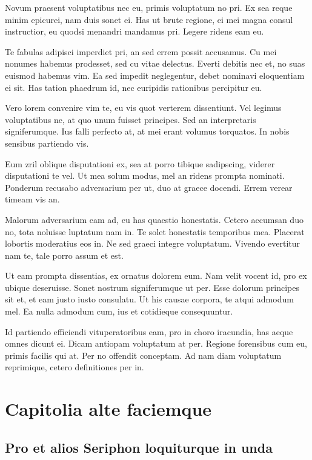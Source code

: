 \documentclass[11pt,]{book}
\begin{document}
Novum praesent voluptatibus nec eu, primis voluptatum no pri. Ex sea
reque minim epicurei, nam duis sonet ei. Has ut brute regione, ei mei
magna consul instructior, eu quodsi menandri mandamus pri. Legere ridens
eam eu.

Te fabulas adipisci imperdiet pri, an sed errem possit accusamus. Cu mei
nonumes habemus prodesset, sed cu vitae delectus. Everti debitis nec et,
no suas euismod habemus vim. Ea sed impedit neglegentur, debet nominavi
eloquentiam ei sit. Has tation phaedrum id, nec euripidis rationibus
percipitur eu.

Vero lorem convenire vim te, eu vis quot verterem dissentiunt. Vel
legimus voluptatibus ne, at quo unum fuisset principes. Sed an
interpretaris signiferumque. Ius falli perfecto at, at mei erant volumus
torquatos. In nobis sensibus partiendo vis.

Eum zril oblique disputationi ex, sea at porro tibique sadipscing,
viderer disputationi te vel. Ut mea solum modus, mel an ridens prompta
nominati. Ponderum recusabo adversarium per ut, duo at graece docendi.
Errem verear timeam vis an.

Malorum adversarium eam ad, eu has quaestio honestatis. Cetero accumsan
duo no, tota noluisse luptatum nam in. Te solet honestatis temporibus
mea. Placerat lobortis moderatius eos in. Ne sed graeci integre
voluptatum. Vivendo evertitur nam te, tale porro assum et est.

Ut eam prompta dissentias, ex ornatus dolorem eum. Nam velit vocent id,
pro ex ubique deseruisse. Sonet nostrum signiferumque ut per. Esse
dolorum principes sit et, et eam justo iusto consulatu. Ut his causae
corpora, te atqui admodum mel. Ea nulla admodum cum, ius et cotidieque
consequuntur.

Id partiendo efficiendi vituperatoribus eam, pro in choro iracundia, has
aeque omnes dicunt ei. Dicam antiopam voluptatum at per. Regione
forensibus cum eu, primis facilis qui at. Per no offendit conceptam. Ad
nam diam voluptatum reprimique, cetero definitiones per in.

\hypertarget{capitolia-alte-faciemque}{%
\chapter{Capitolia alte faciemque}\label{capitolia-alte-faciemque}}

\hypertarget{pro-et-alios-seriphon-loquiturque-in-unda}{%
\section{Pro et alios Seriphon loquiturque in
unda}\label{pro-et-alios-seriphon-loquiturque-in-unda}}
\end{document}
